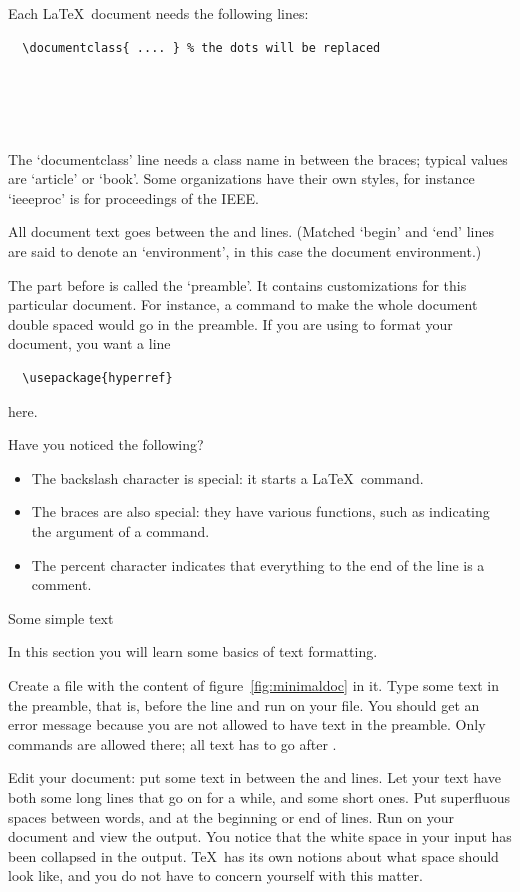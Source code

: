 Each \LaTeX\ document needs the following lines:
\begin{verbatim}
  \documentclass{ .... } % the dots will be replaced

  

    
\end{verbatim}
The `documentclass' line needs a class name in between the braces;
typical values are `article' or `book'. Some organizations have their
own styles, for instance `ieeeproc' is for proceedings of the IEEE.

All document text goes between the \verb++ and
\verb++ lines. (Matched `begin' and `end' lines are said
to denote an `environment', in this case the document environment.)

The part before \verb++ is called the `preamble'. It
contains customizations for this particular document. For instance, a
command to make the whole document double spaced would go in the
preamble. If you are using  to format your document, you
want a line
\begin{verbatim}
  \usepackage{hyperref}
\end{verbatim}
here.

Have you noticed the following?
\begin{itemize}
\item The backslash character is special: it starts a \LaTeX\ command.
\item The braces are also special: they have various functions, such
  as indicating the argument of a command.
\item The percent character indicates that everything to the end of
  the line is a comment.
\end{itemize}

 {Some simple text}

\begin{purpose}
  In this section you will learn some basics of text formatting.
\end{purpose}

\practical
{Create a file  with the content of
  figure~\ref{fig:minimaldoc} in it. Type some text in the preamble,
  that is, before the
   line and run  on your file.}
{You should get an error message because you are not allowed to have text
  in the preamble. Only commands are allowed there; all text has to go after
  .}{}

\practical
{Edit your document: put some text in between the 
 and  lines.
Let your text have both some long lines that go on for a while,
and some short ones. Put superfluous spaces between words, and at the
beginning or end of lines. Run  on your document and view
the output.}
{You notice that the white space in your input has been collapsed in the
  output. \TeX\ has its own notions about what space should look like,
  and you do not have to concern yourself with this matter.}{}


